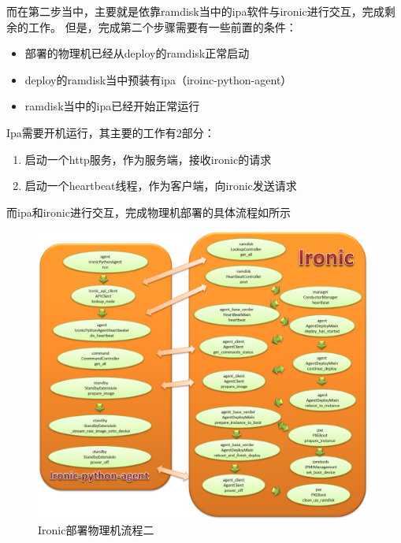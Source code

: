 而在第二步当中，主要就是依靠ramdisk当中的ipa软件与ironic进行交互，完成剩余的工作。
但是，完成第二个步骤需要有一些前置的条件：
\begin{itemize}
  \item 部署的物理机已经从deploy的ramdisk正常启动
  \item deploy的ramdisk当中预装有ipa（iroinc-python-agent）
  \item ramdisk当中的ipa已经开始正常运行
\end{itemize}

Ipa需要开机运行，其主要的工作有2部分：
\begin{enumerate}
  \item 启动一个http服务，作为服务端，接收ironic的请求
  \item 启动一个heartbeat线程，作为客户端，向ironic发送请求
\end{enumerate}

而ipa和ironic进行交互，完成物理机部署的具体流程如所示
\begin{figure}[H]
  \centering
  \includegraphics[width=\linewidth]{ironic_workflow2.png}
  \caption{Ironic部署物理机流程二}
  \label{fig:step2}
\end{figure}

